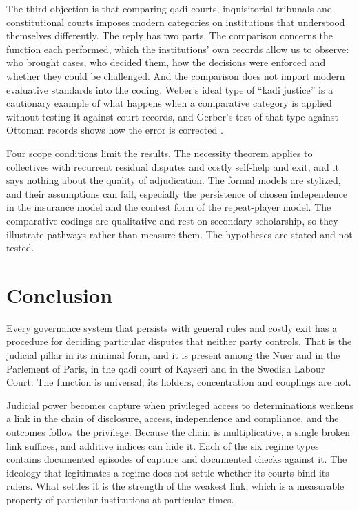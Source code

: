 \documentclass[11pt,letterpaper]{article}
\theoremstyle{definition}
\theoremstyle{remark}
\begin{document}
The third objection is that comparing qadi courts, inquisitorial tribunals and constitutional courts imposes modern categories on institutions that understood themselves differently. The reply has two parts. The comparison concerns the function each performed, which the institutions' own records allow us to observe: who brought cases, who decided them, how the decisions were enforced and whether they could be challenged. And the comparison does not import modern evaluative standards into the coding. Weber's ideal type of ``kadi justice'' is a cautionary example of what happens when a comparative category is applied without testing it against court records, and Gerber's test of that type against Ottoman records shows how the error is corrected \citep{weber1978,gerber1994}.

Four scope conditions limit the results. The necessity theorem applies to collectives with recurrent residual disputes and costly self-help and exit, and it says nothing about the quality of adjudication. The formal models are stylized, and their assumptions can fail, especially the persistence of chosen independence in the insurance model and the contest form of the repeat-player model. The comparative codings are qualitative and rest on secondary scholarship, so they illustrate pathways rather than measure them. The hypotheses are stated and not tested.

\section{Conclusion}

Every governance system that persists with general rules and costly exit has a procedure for deciding particular disputes that neither party controls. That is the judicial pillar in its minimal form, and it is present among the Nuer and in the Parlement of Paris, in the qadi court of Kayseri and in the Swedish Labour Court. The function is universal; its holders, concentration and couplings are not.

Judicial power becomes capture when privileged access to determinations weakens a link in the chain of disclosure, access, independence and compliance, and the outcomes follow the privilege. Because the chain is multiplicative, a single broken link suffices, and additive indices can hide it. Each of the six regime types contains documented episodes of capture and documented checks against it. The ideology that legitimates a regime does not settle whether its courts bind its rulers. What settles it is the strength of the weakest link, which is a measurable property of particular institutions at particular times.
\end{document}

